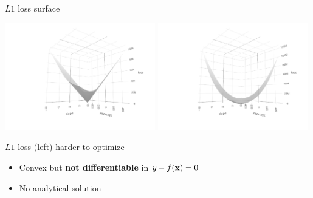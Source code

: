 \documentclass[11pt,compress,t,notes=noshow, xcolor=table]{beamer}
\begin{document}
\begin{vbframe}{$L1$ loss surface}

\includegraphics[width=0.49\textwidth, trim=100 30 100 0, clip]{
figure/reg_l1_surface_abs.pdf}
\includegraphics[width=0.49\textwidth, trim=100 30 100 0, clip]{
figure/reg_l1_surface_quad.pdf}
\vfill

$L1$ loss (left) harder to optimize
\begin{itemize}
    \item Convex but \textbf{not differentiable} in
    $y - f(\mathbf{x}) = 0$
    \item No analytical solution
\end{itemize}

\end{vbframe}

\end{document}

